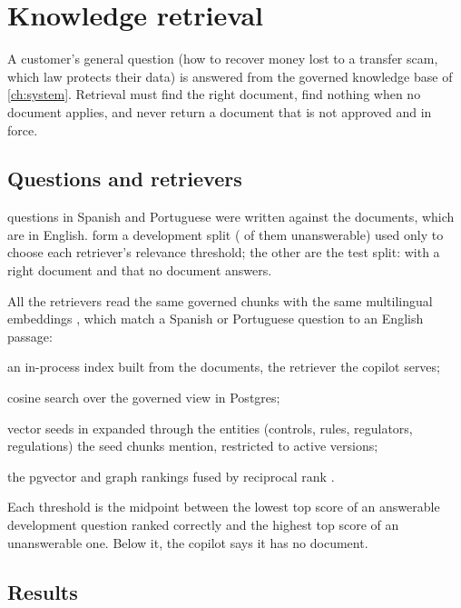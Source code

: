 \chapter{Knowledge retrieval}\label{ch:retrieval}

A customer's general question (how to recover money lost to a transfer scam, which law protects their data) is
answered from the governed knowledge base of \cref{ch:system}. Retrieval must find the right document, find nothing
when no document applies, and never return a document that is not approved and in force.

\section{Questions and retrievers}

 questions in Spanish and Portuguese were written against the documents, which are in
English.  form a development split ( of them unanswerable) used
only to choose each retriever's relevance threshold; the other  are the test split:
 with a right document and  that no document answers.

All the retrievers read the same governed chunks with the same multilingual embeddings
\parencite{wang2024e5}, which match a Spanish or Portuguese question to an English passage:
\begin{description}[style=nextline]
  \item[bundled] an in-process index built from the documents, the retriever the copilot serves;
  \item[pgvector] cosine search over the governed view in Postgres;
  \item[graph] vector seeds in  expanded through the entities (controls, rules, regulators, regulations) the
  seed chunks mention, restricted to active versions;
  \item[hybrid] the pgvector and graph rankings fused by reciprocal rank \parencite{cormack2009}.
\end{description}
Each threshold is the midpoint between the lowest top score of an answerable development question ranked correctly
and the highest top score of an unanswerable one. Below it, the copilot says it has no document.

\section{Results}

